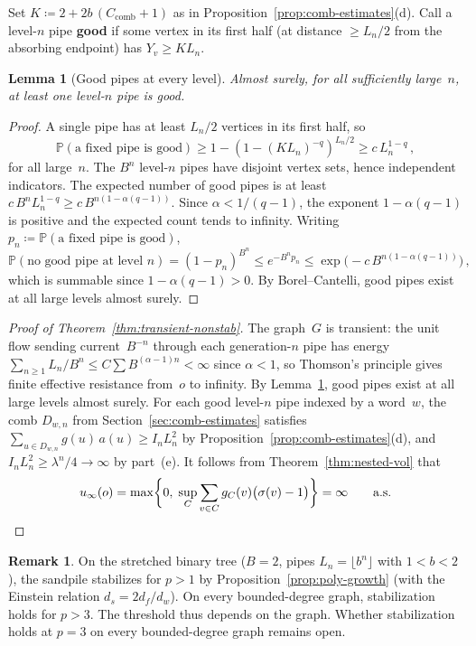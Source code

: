 \documentclass[11pt]{amsart}
\theoremstyle{plain}
\newtheorem{lemma}[theorem]{Lemma}
\theoremstyle{definition}
\newtheorem{remark}[theorem]{Remark}
\renewcommand{\P}{\mathbb{P}}
\begin{document}
	Set $K\coloneqq 2+2b\,(C_{\mathrm{comb}}+1)$ as in Proposition~\ref{prop:comb-estimates}(d). Call a level-$n$ pipe \textbf{good} if some vertex in its first half (at distance $\geq L_n/2$ from the absorbing endpoint) has $Y_v\geq KL_n$.
	
	\begin{lemma}[Good pipes at every level]\label{lem:tr-good}
		Almost surely, for all sufficiently large~$n$, at least one level-$n$ pipe is good.
	\end{lemma}
	
	\begin{proof}
		A single pipe has at least $L_n/2$ vertices in its first half, so
		\[
		\P(\text{a fixed pipe is good})
		\geq 1-(1-(KL_n)^{-q})^{L_n/2}
		\geq c\,L_n^{1-q}\,,
		\]
		for all large~$n$. The $B^n$ level-$n$ pipes have disjoint vertex sets, hence independent indicators. The expected number of good pipes is at least $c\,B^n L_n^{1-q}\geq c\,B^{n(1-\alpha(q-1))}$. Since $\alpha<1/(q{-}1)$, the exponent $1-\alpha(q{-}1)$ is positive and the expected count tends to infinity. Writing $p_n\coloneqq\P(\text{a fixed pipe is good})$,
		\[
		\P(\text{no good pipe at level }n)
		=(1-p_n)^{B^n}
		\leq e^{-B^n p_n}
		\leq\exp\bigl(-c\,B^{n(1-\alpha(q-1))}\bigr)\,,
		\]
		which is summable since $1-\alpha(q{-}1)>0$. By Borel--Cantelli, good pipes exist at all large levels almost surely.
	\end{proof}
	
	\begin{proof}[Proof of Theorem~\ref{thm:transient-nonstab}]
		The graph~$G$ is transient: the unit flow sending current~$B^{-n}$ through each generation-$n$ pipe has energy $\sum_{n\geq 1}L_n/B^n\leq C\sum B^{(\alpha-1)n}<\infty$ since $\alpha<1$, so Thomson's principle \citep[Section~2.4]{LP16} gives finite effective resistance from~$o$ to infinity. By Lemma~\ref{lem:tr-good}, good pipes exist at all large levels almost surely. For each good level-$n$ pipe indexed by a word~$w$, the comb $D_{w,n}$ from Section~\ref{sec:comb-estimates} satisfies $\sum_{u\in D_{w,n}}g(u)\,a(u)\geq I_n L_n^2$ by Proposition~\ref{prop:comb-estimates}(d), and $I_n L_n^2\geq\lambda^n/4\to\infty$ by part~(e). It follows from Theorem~\ref{thm:nested-vol} that
		\[
		u_\infty(o)
		=\max\biggl\{0,\;\sup_C\sum_{v\in C} g_C(v)\bigl(\sigma(v)-1\bigr)\biggr\}
		=\infty\qquad\text{a.s.}\qedhere
		\]
	\end{proof}
	
	\begin{remark}
		On the stretched binary tree ($B=2$, pipes $L_n=\lfloor b^n\rfloor$ with $1<b<2$), the sandpile stabilizes for $p>1$ by Proposition~\ref{prop:poly-growth} (with the Einstein relation $d_s=2d_f/d_w$). On every bounded-degree graph, stabilization holds for $p>3$. The threshold thus depends on the graph. Whether stabilization holds at $p=3$ on every bounded-degree graph remains open.
	\end{remark}
	
\end{document}

